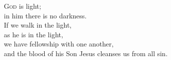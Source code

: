 
\lettrine{G}{od} is light;\\
in him there is no darkness.\\
If we walk in the light,\\
as he is in the light,\\
we have fellowship with one another,\\
and the blood of his Son Jesus cleanses us from all sin.

